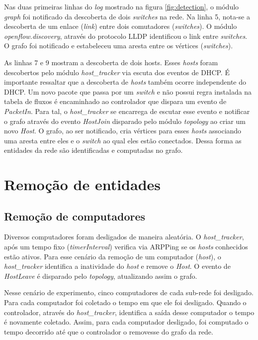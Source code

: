Nas duas primeiras linhas do \emph{log} mostrado na figura
\ref{fig:detection}, o módulo \emph{graph} foi notificado
da descoberta de dois \emph{switches} na rede.
Na linha 5, nota-se a descoberta de um enlace (\emph{link}) entre dois
comutadores (\emph{switches}).
O módulo \emph{openflow.discovery}, através do protocolo LLDP identificou 
o link entre \emph{switches}.
O grafo foi notificado e estabeleceu uma aresta entre os 
vértices (\emph{switches}).

As linhas 7 e 9 mostram a descoberta de dois hosts.
Esses \emph{hosts} foram descobertos pelo módulo \emph{host\_tracker} via 
escuta dos eventos de DHCP.
É importante ressaltar que a descoberta de \emph{hosts} também ocorre 
independente do DHCP.
Um novo pacote que passa por um \emph{switch} e não possui regra
instalada na tabela de fluxos é encaminhado ao controlador que 
dispara um evento de \emph{PacketIn}. 
Para tal, o \emph{host\_tracker} se encarrega de escutar esse evento 
e notificar o grafo através do evento \emph{HostJoin} disparado pelo módulo
\emph{topology} ao criar um novo \emph{Host}.
O grafo, ao ser notificado, cria vértices para esses \emph{hosts} associando 
uma aresta entre eles e o \emph{switch} ao qual eles estão conectados.
Dessa forma as entidades da rede são identificadas e computadas no grafo.


\section{Remoção de entidades}

\subsection{Remoção de computadores}

Diversos computadores foram desligados de maneira aleatória.
O \emph{host\_tracker}, após um tempo fixo (\emph{timerInterval}) 
verifica via ARPPing se os \emph{hosts} conhecidos estão ativos.
Para esse cenário da remoção de um computador (\emph{host}), 
o \emph{host\_tracker} identifica a inatividade do \emph{host} e remove o 
\emph{Host}.
O evento de \emph{HostLeave} é disparado pelo \emph{topology}, 
atualizando assim o grafo.

Nesse cenário de experimento, cinco computadores de cada sub-rede foi desligado.
Para cada computador foi coletado o tempo em que ele foi desligado.
Quando o controlador, através do \emph{host\_tracker}, identifica a saída 
desse computador o tempo é novamente coletado.
Assim, para cada computador desligado, foi computado o tempo decorrido até 
que o controlador o removesse do grafo da rede.

